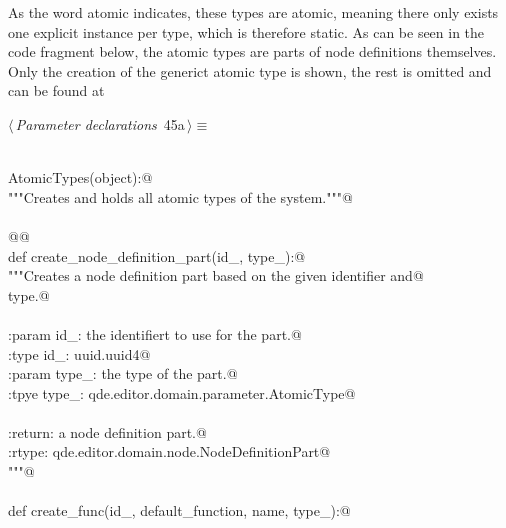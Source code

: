\documentclass[
    a4paper,      %
    10pt,         %
    openright,    %
    notitlepage,  %
    parskip=half, %
]{scrreprt}       %
\theoremstyle{definition}                    %
\begin{document}
As the word atomic indicates, these types are atomic, meaning there only exists
one explicit instance per type, which is therefore static. As can be seen in
the code fragment below, the atomic types are parts of node definitions
themselves. Only the creation of the generict atomic type is shown, the rest is
omitted and can be found at~

\begin{flushleft} \small
\begin{minipage}{\linewidth}\label{scrap56}\raggedright\small
{} $\langle\,${\itshape Parameter declarations}\nobreak\ {\footnotesize {45a}}$\,\rangle\equiv$
\vspace{-1exm}
\begin{list}{}{} \item
\mbox{}\lstinline@@\\
\mbox{}\lstinline@class AtomicTypes(object):@\\
\mbox{}\lstinline@    """Creates and holds all atomic types of the system."""@\\
\mbox{}\lstinline@@\\
\mbox{}\lstinline@    @{\normalfont \fontfamily @}\lstinline@staticmethod@\\
\mbox{}\lstinline@    def create_node_definition_part(id_, type_):@\\
\mbox{}\lstinline@        """Creates a node definition part based on the given identifier and@\\
\mbox{}\lstinline@        type.@\\
\mbox{}\lstinline@@\\
\mbox{}\lstinline@        :param id_: the identifiert to use for the part.@\\
\mbox{}\lstinline@        :type  id_: uuid.uuid4@\\
\mbox{}\lstinline@        :param type_: the type of the part.@\\
\mbox{}\lstinline@        :tpye type_: qde.editor.domain.parameter.AtomicType@\\
\mbox{}\lstinline@@\\
\mbox{}\lstinline@        :return: a node definition part.@\\
\mbox{}\lstinline@        :rtype: qde.editor.domain.node.NodeDefinitionPart@\\
\mbox{}\lstinline@        """@\\
\mbox{}\lstinline@@\\
\mbox{}\lstinline@        def create_func(id_, default_function, name, type_):@\\

\end{list}
\end{minipage}
\end{flushleft}
\end{document}
